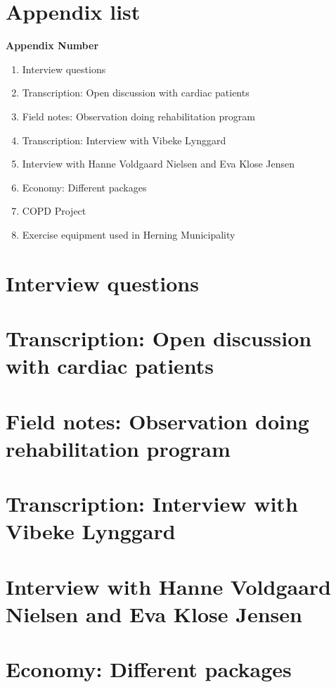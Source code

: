 \chapter{Appendix list}

\textbf{Appendix Number}
\begin{enumerate}
	\item Interview questions
	\item Transcription: Open discussion with cardiac patients
	\item Field notes: Observation doing rehabilitation program
	\item Transcription: Interview with Vibeke Lynggard
	\item Interview with Hanne Voldgaard Nielsen and Eva Klose Jensen
	\item Economy: Different packages
	\item COPD Project
	\item Exercise equipment used in Herning Municipality
\end{enumerate}



\chapter{Interview questions} \label{interviewquestion}

\chapter{Transcription: Open discussion with cardiac patients} \label{open}

\chapter{Field notes: Observation doing rehabilitation program} \label{field}

\chapter{Transcription: Interview with Vibeke Lynggard} \label{vibeke}

\chapter{Interview with Hanne Voldgaard Nielsen and Eva Klose Jensen}

\chapter{Economy: Different packages} \label{economics}

